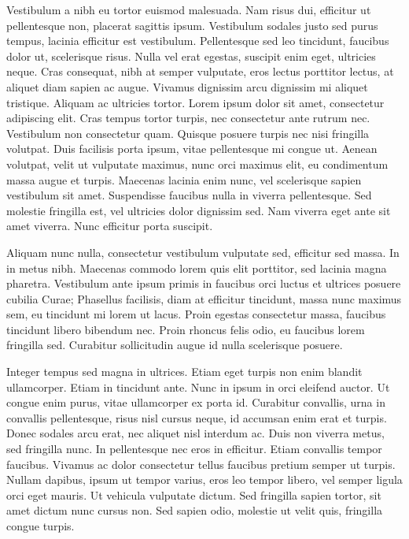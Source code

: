Vestibulum a nibh eu tortor euismod malesuada. Nam risus dui, efficitur ut pellentesque non, placerat sagittis ipsum. Vestibulum sodales justo sed purus tempus, lacinia efficitur est vestibulum. Pellentesque sed leo tincidunt, faucibus dolor ut, scelerisque risus. Nulla vel erat egestas, suscipit enim eget, ultricies neque. Cras consequat, nibh at semper vulputate, eros lectus porttitor lectus, at aliquet diam sapien ac augue. Vivamus dignissim arcu dignissim mi aliquet tristique. Aliquam ac ultricies tortor.
Lorem ipsum dolor sit amet, consectetur adipiscing elit. Cras tempus tortor turpis, nec consectetur ante rutrum nec. Vestibulum non consectetur quam. Quisque posuere turpis nec nisi fringilla volutpat. Duis facilisis porta ipsum, vitae pellentesque mi congue ut. Aenean volutpat, velit ut vulputate maximus, nunc orci maximus elit, eu condimentum massa augue et turpis. Maecenas lacinia enim nunc, vel scelerisque sapien vestibulum sit amet. Suspendisse faucibus nulla in viverra pellentesque. Sed molestie fringilla est, vel ultricies dolor dignissim sed. Nam viverra eget ante sit amet viverra. Nunc efficitur porta suscipit.

Aliquam nunc nulla, consectetur vestibulum vulputate sed, efficitur sed massa. In in metus nibh. Maecenas commodo lorem quis elit porttitor, sed lacinia magna pharetra. Vestibulum ante ipsum primis in faucibus orci luctus et ultrices posuere cubilia Curae; Phasellus facilisis, diam at efficitur tincidunt, massa nunc maximus sem, eu tincidunt mi lorem ut lacus. Proin egestas consectetur massa, faucibus tincidunt libero bibendum nec. Proin rhoncus felis odio, eu faucibus lorem fringilla sed. Curabitur sollicitudin augue id nulla scelerisque posuere.

Integer tempus sed magna in ultrices. Etiam eget turpis non enim blandit ullamcorper. Etiam in tincidunt ante. Nunc in ipsum in orci eleifend auctor. Ut congue enim purus, vitae ullamcorper ex porta id. Curabitur convallis, urna in convallis pellentesque, risus nisl cursus neque, id accumsan enim erat et turpis. Donec sodales arcu erat, nec aliquet nisl interdum ac. Duis non viverra metus, sed fringilla nunc. In pellentesque nec eros in efficitur. Etiam convallis tempor faucibus. Vivamus ac dolor consectetur tellus faucibus pretium semper ut turpis. Nullam dapibus, ipsum ut tempor varius, eros leo tempor libero, vel semper ligula orci eget mauris. Ut vehicula vulputate dictum. Sed fringilla sapien tortor, sit amet dictum nunc cursus non. Sed sapien odio, molestie ut velit quis, fringilla congue turpis.

